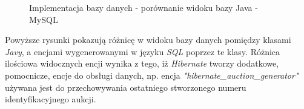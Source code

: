 \documentclass[10pt,titlepage]{article} %
\begin{document}
\begin{figure}[H]%
    \centering
    \qquad
        \caption[Implementacja bazy danych - porównanie widoku bazy Java - SQL]{Implementacja bazy danych - porównanie widoku bazy Java - MySQL}%
\end{figure}
Powyższe rysunki pokazują różnicę w widoku bazy danych pomiędzy klasami \textit{Javy}, a encjami wygenerowanymi w języku \textit{SQL} poprzez te klasy. Różnica ilościowa widocznych encji wynika z tego, iż \textit{Hibernate} tworzy dodatkowe, pomocnicze, encje do obsługi danych, np. encja \textit{"hibernate\_auction\_generator"} używana jest do przechowywania ostatniego stworzonego numeru identyfikacyjnego aukcji.
\end{document}

